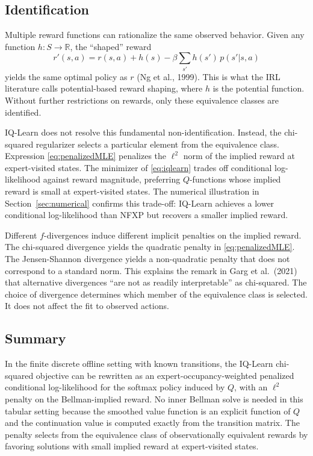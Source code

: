 \documentclass[11pt]{article}
\begin{document}
\subsection{Identification}

Multiple reward functions can rationalize the same observed behavior. Given any function $h\!: S \to \mathbb{R}$, the ``shaped'' reward
\[
r'(s,a) = r(s,a) + h(s) - \beta \sum_{s'} h(s')\,p(s'|s,a)
\]
yields the same optimal policy as $r$ (Ng et al., 1999). This is what the IRL literature calls potential-based reward shaping, where $h$ is the potential function. Without further restrictions on rewards, only these equivalence classes are identified.

IQ-Learn does not resolve this fundamental non-identification. Instead, the chi-squared regularizer selects a particular element from the equivalence class. Expression \eqref{eq:penalizedMLE} penalizes the $\ell^2$ norm of the implied reward at expert-visited states. The minimizer of \eqref{eq:iqlearn} trades off conditional log-likelihood against reward magnitude, preferring $Q$-functions whose implied reward is small at expert-visited states. The numerical illustration in Section~\ref{sec:numerical} confirms this trade-off: IQ-Learn achieves a lower conditional log-likelihood than NFXP but recovers a smaller implied reward.

Different $f$-divergences induce different implicit penalties on the implied reward. The chi-squared divergence yields the quadratic penalty in \eqref{eq:penalizedMLE}. The Jensen-Shannon divergence yields a non-quadratic penalty that does not correspond to a standard norm. This explains the remark in Garg et al.\ (2021) that alternative divergences ``are not as readily interpretable'' as chi-squared. The choice of divergence determines which member of the equivalence class is selected. It does not affect the fit to observed actions.

\subsection{Summary}

In the finite discrete offline setting with known transitions, the IQ-Learn chi-squared objective can be rewritten as an expert-occupancy-weighted penalized conditional log-likelihood for the softmax policy induced by $Q$, with an $\ell^2$ penalty on the Bellman-implied reward. No inner Bellman solve is needed in this tabular setting because the smoothed value function is an explicit function of $Q$ and the continuation value is computed exactly from the transition matrix. The penalty selects from the equivalence class of observationally equivalent rewards by favoring solutions with small implied reward at expert-visited states.
\end{document}

